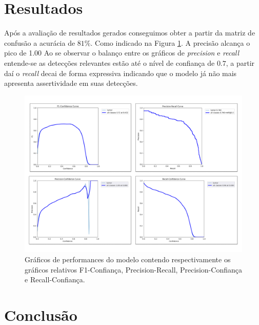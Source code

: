 \documentclass[12pt]{article}
\begin{document}
\section{Resultados}

Após a avaliação de resultados gerados conseguimos obter a partir da matriz de confusão a acurácia de $81\%$. Como indicado na Figura \ref{fig:graph}. A precisão alcança o pico de 1.00 Ao se observar o balanço entre os gráficos de {\it precision} e {\it recall} entende-se as detecções relevantes estão até o nível de confiança de $0.7$, a partir daí o {\it recall} decai de forma expressiva indicando que o modelo já não mais apresenta assertividade em suas detecções.




\begin{figure}[ht]
  \centering
  \includegraphics[width=1\textwidth]{images/graph_results.png}
  \caption{Gráficos de performances do modelo contendo respectivamente os gráficos relativos F1-Confiança, Precision-Recall, Precision-Confiança e Recall-Confiança.}
  \label{fig:graph}
\end{figure}

\FloatBarrier

\section{Conclusão}



\end{document}

